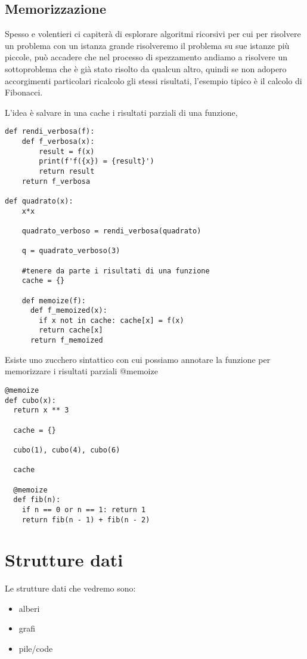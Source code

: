 \subsection{Memorizzazione}
Spesso e volentieri ci capiterà di esplorare algoritmi ricorsivi per cui per risolvere un problema con un istanza grande risolveremo il problema su sue istanze più piccole, può accadere che nel processo di spezzamento andiamo a risolvere un sottoproblema che è già stato risolto da qualcun altro, quindi se non adopero accorgimenti particolari ricalcolo gli stessi risultati, l'esempio tipico è il calcolo di Fibonacci.

L'idea è salvare in una cache i risultati parziali di una funzione,

\begin{lstlisting} 
def rendi_verbosa(f):
    def f_verbosa(x):
        result = f(x)
        print(f'f({x}) = {result}')
        return result
    return f_verbosa

def quadrato(x):
    x*x

    quadrato_verboso = rendi_verbosa(quadrato)

    q = quadrato_verboso(3)

    #tenere da parte i risultati di una funzione
    cache = {}
    
    def memoize(f):
      def f_memoized(x):
        if x not in cache: cache[x] = f(x)
        return cache[x]
      return f_memoized
\end{lstlisting}
Esiste uno zucchero sintattico con cui possiamo annotare la funzione per memorizzare i risultati parziali @memoize

\begin{lstlisting} 
@memoize 
def cubo(x):
  return x ** 3

  cache = {}

  cubo(1), cubo(4), cubo(6)
  
  cache

  @memoize
  def fib(n):
    if n == 0 or n == 1: return 1
    return fib(n - 1) + fib(n - 2)
\end{lstlisting}

\section{Strutture dati}
Le strutture dati che vedremo sono:
\begin{itemize}
    \item alberi
    \item grafi
    \item pile/code
\end{itemize}

